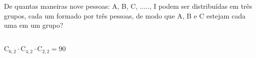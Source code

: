 \begin{ex}
 De quantas maneiras nove pessoas: A, B, C, ....., I podem ser distribuídas em três grupos, cada um formado por três pessoas, de modo que A, B e C estejam cada uma em um grupo?
  \begin{sol}
      \phantom{A} \\
  $\mathrm{C}_{6,2} \cdot \mathrm{C}_{4,2} \cdot \mathrm{C}_{2,2} = 90$
  \end{sol}
\end{ex}